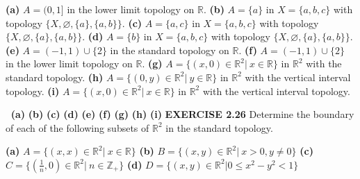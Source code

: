 \documentclass[12pt]{article}
\begin{document}
  \begin{adjustwidth}{1cm}{0cm}
    \begin{flushleft}
      \textbf{(a)} \(A = (0,1]\) in the lower limit topology on \(\mathbb{R}\). \newline
      \textbf{(b)} \(A = \{a\}\) in \(X = \{a,b,c\}\) with topology \(\{X, \varnothing, \{a\}, \{a,b\}\}\). \newline
      \textbf{(c)} \(A = \{a,c\}\) in \(X = \{a,b,c\}\) with topology \(\{X, \varnothing, \{a\}, \{a,b\}\}\). \newline
      \textbf{(d)} \(A = \{b\}\) in \(X = \{a,b,c\}\) with topology \(\{X, \varnothing, \{a\}, \{a,b\}\}\). \newline
      \textbf{(e)} \(A = (-1,1) \cup \{2\}\) in the standard topology on \(\mathbb{R}\). \newline
      \textbf{(f)} \(A = (-1,1) \cup \{2\}\) in the lower limit topology on \(\mathbb{R}\). \newline
      \textbf{(g)} \(A = \{(x,0)\in\mathbb{R}^2|\ x \in \mathbb{R}\}\) in \(\mathbb{R}^2\) with the standard topology. \newline
      \textbf{(h)} \(A = \{(0,y) \in \mathbb{R}^2|\ y \in \mathbb{R}\}\) in \(\mathbb{R}^2\) with the vertical interval topology. \newline
      \textbf{(i)} \(A = \{(x,0)\in\mathbb{R}^2|\ x \in \mathbb{R}\}\) in \(\mathbb{R}^2\) with the vertical interval topology.
  \end{flushleft}
\end{adjustwidth}
  \(\ \) \newline
  \textbf{(a)}  \newline
  \textbf{(b)}  \newline
  \textbf{(c)}  \newline
  \textbf{(d)}  \newline
  \textbf{(e)}  \newline
  \textbf{(f)}  \newline
  \textbf{(g)}  \newline
  \textbf{(h)}  \newline
  \textbf{(i)} 
  \newpage
  \noindent
  \textbf{EXERCISE 2.26}
  Determine the boundary of each of the following subsets of \(\mathbb{R}^2\) in the standard topology.
  \begin{adjustwidth}{1cm}{0cm}
    \begin{flushleft}
      \textbf{(a)} \(A = \{(x,x) \in \mathbb{R}^2|\ x \in \mathbb{R}\}\) \newline
      \textbf{(b)} \(B = \{(x,y) \in \mathbb{R}^2|\ x>0,y \neq 0\}\) \newline
      \textbf{(c)} \(C = \{(\frac{1}{n}, 0) \in \mathbb{R}^2|\ n \in \mathbb{Z}_+\}\) \newline
      \textbf{(d)} \(D = \{(x,y) \in \mathbb{R}^2|0\leq x^2 - y^2 < 1\}\)
    \end{flushleft}
\end{adjustwidth}
\end{document}

